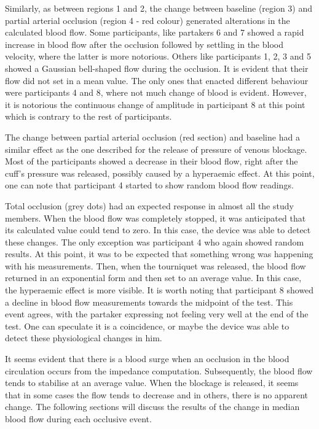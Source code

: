 Similarly, as between regions 1 and 2, the change between baseline (region 3) and partial arterial occlusion (region 4 - red colour) generated alterations in the calculated blood flow. Some participants, like partakers 6 and 7 showed a rapid increase in blood flow after the occlusion followed by settling in the blood velocity, where the latter is more notorious. Others like participants 1, 2, 3 and 5 showed a Gaussian bell-shaped flow during the occlusion. It is evident that their flow did not set in a mean value. The only ones that enacted different behaviour were participants 4 and 8, where not much change of blood is evident. However, it is notorious the continuous change of amplitude in participant 8 at this point which is contrary to the rest of participants.

The change between partial arterial occlusion (red section) and baseline had a similar effect as the one described for the release of pressure of venous blockage. Most of the participants showed a decrease in their blood flow, right after the cuff's pressure was released, possibly caused by a hyperaemic effect. At this point, one can note that participant 4 started to show random blood flow readings.

Total occlusion (grey dots) had an expected response in almost all the study members. When the blood flow was completely stopped, it was anticipated that its calculated value could tend to zero. In this case, the device was able to detect these changes. The only exception was participant 4 who again showed random results. At this point, it was to be expected that something wrong was happening with his measurements. Then, when the tourniquet was released, the blood flow returned in an exponential form and then set to an average value. In this case, the hyperaemic effect is more visible. It is worth noting that participant 8 showed a decline in blood flow measurements towards the midpoint of the test. This event agrees, with the partaker expressing not feeling very well at the end of the test. One can speculate it is a coincidence, or maybe the device was able to detect these physiological changes in him.

It seems evident that there is a blood surge when an occlusion in the blood circulation occurs from the impedance computation. Subsequently, the blood flow tends to stabilise at an average value. When the blockage is released, it seems that in some cases the flow tends to decrease and in others, there is no apparent change. The following sections will discuss the results of the change in median blood flow during each occlusive event.


